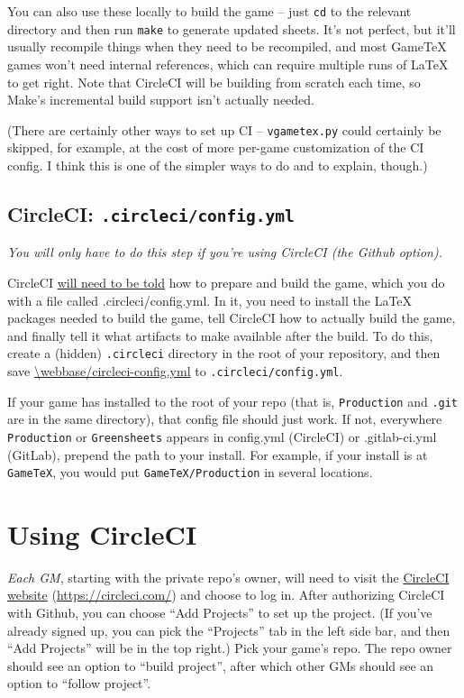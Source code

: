 \documentclass[green]{testgame}
\begin{document}
You can also use these locally to build the game -- just \texttt{cd} to the relevant directory and then run \texttt{make} to generate updated sheets. It's not perfect, but it'll usually recompile things when they need to be recompiled, and most GameTeX games won't need internal references, which can require multiple runs of \LaTeX{} to get right. Note that CircleCI will be building from scratch each time, so Make's incremental build support isn't actually needed.

(There are certainly other ways to set up CI -- \texttt{vgametex.py} could certainly be skipped, for example, at the cost of more per-game customization of the CI config. I think this is one of the simpler ways to do and to explain, though.)

\subsection{CircleCI: \texttt{.circleci/config.yml}}

\emph{You will only have to do this step if you're using CircleCI (the Github option).}

CircleCI \href{https://circleci.com/docs/2.0/configuration-reference/}{will need to be told} how to prepare and build the game, which you do with a file called .circleci/config.yml. In it, you need to install the LaTeX packages needed to build the game, tell CircleCI how to actually build the game, and finally tell it what artifacts to make available after the build. To do this, create a (hidden) \texttt{.circleci} directory in the root of your repository, and then save \url{\webbase/circleci-config.yml} to \texttt{.circleci/config.yml}.

If your game has \GameTeX{} installed to the root of your repo (that is, \texttt{Production} and \texttt{.git} are in the same directory), that config file should just work. If not, everywhere \texttt{Production} or \texttt{Greensheets} appears in config.yml (CircleCI) or .gitlab-ci.yml (GitLab), prepend the path to your \GameTeX{} install. For example, if your \GameTeX{} install is at \texttt{GameTeX}, you would put \texttt{GameTeX/Production} in several locations.


\section{Using CircleCI}

\emph{Each GM}, starting with the private repo's owner, will need to visit the \href{https://circleci.com/}{CircleCI website} (\url{https://circleci.com/}) and choose to log in. After authorizing CircleCI with Github, you can choose ``Add Projects'' to set up the project. (If you've already signed up, you can pick the ``Projects'' tab in the left side bar, and then ``Add Projects'' will be in the top right.) Pick your game's repo. The repo owner should see an option to ``build project'', after which other GMs should see an option to ``follow project''.
\end{document}
